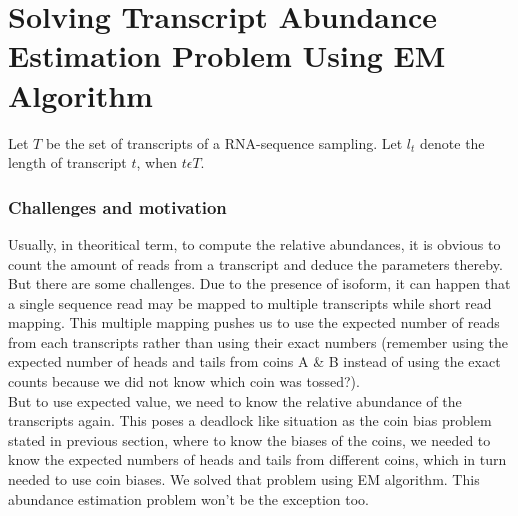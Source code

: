 \section{Solving Transcript Abundance Estimation Problem Using EM Algorithm}

Let $T$  be the set of transcripts of a RNA-sequence sampling. Let $l_t$ denote the length of transcript $t$, when $t \epsilon T$.
\subsubsection{Challenges and motivation}
Usually, in theoritical term, to compute the relative abundances, it is obvious to count the amount of reads from a transcript and deduce the parameters thereby. But there are some challenges. Due to the presence of isoform, it can happen that a single sequence read may be mapped to multiple transcripts while short read mapping. This multiple mapping pushes us to use the expected number of reads from each transcripts rather than using their exact numbers (remember using the expected number of heads and tails from coins A \& B instead of using the exact counts because we did not know which coin was tossed?).\\
But to use expected value, we need to know the relative abundance of the transcripts again. This poses a deadlock like situation as the coin bias problem stated in previous section, where to know the biases of the coins, we needed to know the expected numbers of heads and tails from different coins, which in turn needed to use coin biases. We solved that problem using EM algorithm. This abundance estimation problem won't be the exception too.

